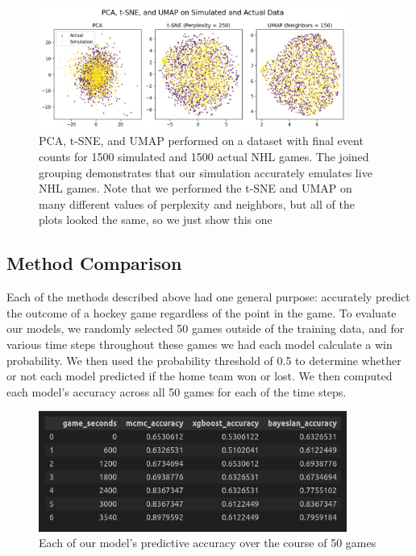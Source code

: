 \documentclass[11pt]{article}
\begin{document}
\begin{figure}[H]
    \centering
    \includegraphics[width=0.9\textwidth]{images/pca_tsne_umap_sim_act.png}
    \caption{PCA, t-SNE, and UMAP performed on a dataset with final event counts for 1500 simulated and 1500 actual NHL games. The joined grouping demonstrates that our simulation accurately emulates live NHL games. Note that we performed the t-SNE and UMAP on many different values of perplexity and neighbors, but all of the plots looked the same, so we just show this one}
    \label{fig:simulation_v_actual}
\end{figure}

\subsection{Method Comparison}
Each of the methods described above had one general purpose: accurately predict the outcome of a hockey game regardless of the point in the game. To evaluate our models, we randomly selected 50 games outside of the training data, and for various time steps throughout these games we had each model calculate a win probability. We then used the probability threshold of 0.5 to determine whether or not each model predicted if the home team won or lost. We then computed each model's accuracy across all 50 games for each of the time steps.

\begin{figure}[H]
    \centering
    \includegraphics[width=0.9\textwidth]{images/game_accuracies.png}
    \caption{Each of our model's predictive accuracy over the course of 50 games}
    \label{fig:game_accuracies}
\end{figure}
\end{document}
